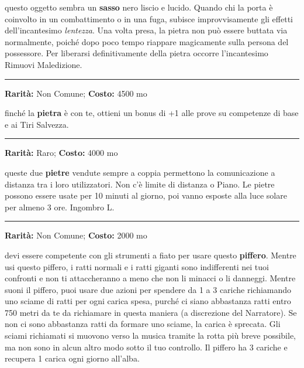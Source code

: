 \begin{multicols}{2}
questo oggetto sembra un \textbf{sasso} nero liscio e lucido. Quando chi la porta è coinvolto in un combattimento o in una fuga, subisce improvvisamente gli effetti dell'incantesimo \emph{lentezza}. Una volta presa, la pietra non può essere buttata via normalmente, poiché dopo poco tempo riappare magicamente sulla persona del possessore. Per liberarsi definitivamente della pietra occorre l'incantesimo Rimuovi Maledizione.

\smallskip\noindent\rule{\linewidth}{2pt}  \hypertarget{PietradellaBuonaSorte}{}\smallskip{}\noindent\label{PietradellaBuonaSorte}

\textbf{Rarità:} Non Comune; \textbf{Costo:} 4500 mo

finché la \textbf{pietra} è con te, ottieni un bonus di +1 alle prove su competenze di base e ai Tiri Salvezza.

\smallskip\noindent\rule{\linewidth}{2pt}  \hypertarget{Pietreparlanti}{}\smallskip{}\noindent\label{Pietreparlanti}

\textbf{Rarità:} Raro; \textbf{Costo:} 4000 mo

queste due \textbf{pietre} vendute sempre a coppia permettono la comunicazione a distanza tra i loro utilizzatori. Non c'è limite di distanza o Piano. Le pietre possono essere usate per 10 minuti al giorno, poi vanno esposte alla luce solare per almeno 3 ore. Ingombro L.

\smallskip\noindent\rule{\linewidth}{2pt}  \hypertarget{PifferodelleFogne}{}\smallskip{}\noindent\label{PifferodelleFogne}

\textbf{Rarità:} Non Comune; \textbf{Costo:} 2000 mo

devi essere competente con gli strumenti a fiato per usare questo \textbf{piffero}. Mentre usi questo piffero, i ratti normali e i ratti giganti sono indifferenti nei tuoi confronti e non ti attaccheranno a meno che non li minacci o li danneggi. Mentre suoni il piffero, puoi usare due azioni per spendere da 1 a 3 cariche richiamando uno sciame di ratti per ogni carica spesa, purché ci siano abbastanza ratti entro 750 metri da te da richiamare in questa maniera (a discrezione del Narratore). Se non ci sono abbastanza ratti da formare uno sciame, la carica è sprecata. Gli sciami richiamati si muovono verso la musica tramite la rotta più breve possibile, ma non sono in alcun altro modo sotto il tuo controllo. Il piffero ha 3 cariche e recupera 1 carica ogni giorno all'alba.


\end{multicols}

